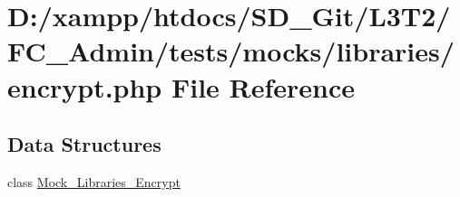 \hypertarget{tests_2mocks_2libraries_2_encrypt_8php}{}\section{D\+:/xampp/htdocs/\+S\+D\+\_\+\+Git/\+L3\+T2/\+F\+C\+\_\+\+Admin/tests/mocks/libraries/encrypt.php File Reference}
\label{tests_2mocks_2libraries_2_encrypt_8php}
\subsection*{Data Structures}
\begin{DoxyCompactItemize}
\item 
class \hyperlink{class_mock___libraries___encrypt}{Mock\+\_\+\+Libraries\+\_\+\+Encrypt}
\end{DoxyCompactItemize}
